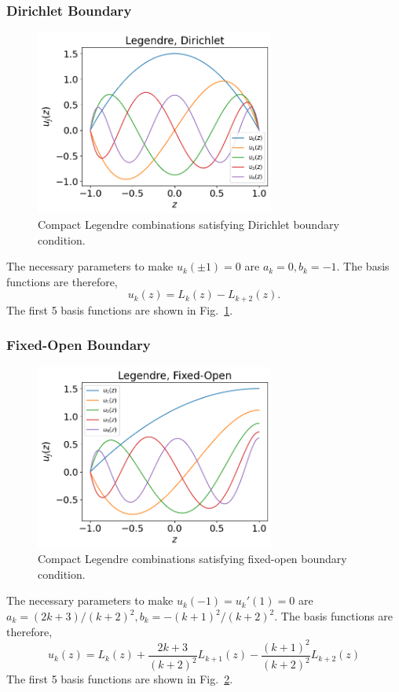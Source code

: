 \subsubsection*{Dirichlet Boundary}
\begin{figure} [htbp]
	\centering
	\includegraphics[width=0.7\textwidth]{figures/legendre-dirichlet.png}
	\caption{Compact Legendre combinations satisfying Dirichlet boundary condition.}
	\label{fig:legendre-dirichlet}
\end{figure}
The necessary parameters to make $u_k(\pm 1) = 0$ are $a_k=0, b_k=-1$. The basis functions are therefore,
\begin{equation}
	u_k(z) = L_k(z) - L_{k+2}(z).
\end{equation}
The first 5 basis functions are shown in Fig.~\ref{fig:legendre-dirichlet}.

\subsubsection*{Fixed-Open Boundary}
\begin{figure} [htbp]
	\centering
	\includegraphics[width=0.7\textwidth]{figures/legendre-fixed-open.png}
	\caption{Compact Legendre combinations satisfying fixed-open boundary condition.}
	\label{fig:legendre-fixed-open}
\end{figure}
The necessary parameters to make $u_k(-1)=u_k'(1)=0$ are $a_k=(2k+3)/(k+2)^2, b_k=-(k+1)^2/(k+2)^2$. The basis functions are therefore,
\begin{equation}
	u_k(z) = L_k(z) + \frac{2k+3}{(k+2)^2}L_{k+1}(z) - \frac{(k+1)^2}{(k+2)^2}L_{k+2}(z)
\end{equation}
The first 5 basis functions are shown in Fig.~\ref{fig:legendre-fixed-open}.

